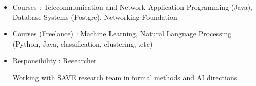 \documentclass[10pt,a4paper,ragged2e]{altacv}
\begin{document}
	
	\divider
	
	
	\begin{itemize}
		\item Courses : Telecommunication and Network Application Programming (Java), Database Systems (Postgre), Networking Foundation
		\item Courses (Freelance) : Machine Learning, Natural Language Processing (Python, Java, classification, clustering, .etc)
	\end{itemize}

	
	\divider
	
%	
	
%		
	\begin{itemize}
		\item Responsibility : Researcher
		
		Working with SAVE research team in formal methods and AI directions
	\end{itemize}
\end{document}
